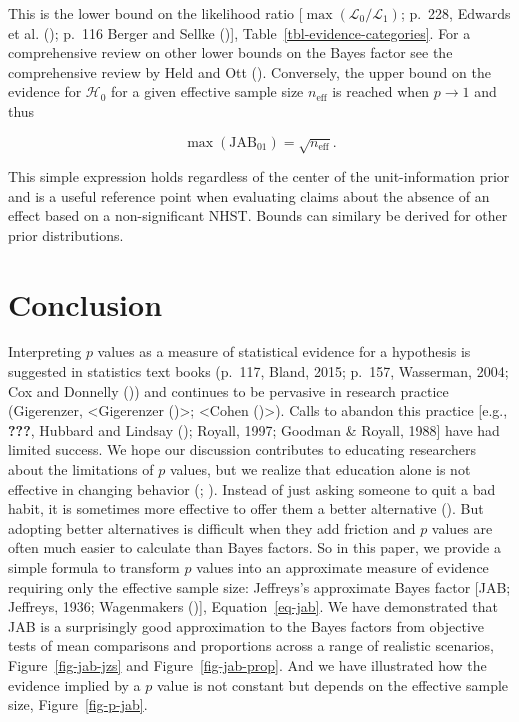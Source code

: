 \documentclass[
  man,
  floatsintext,
  longtable,
  nolmodern,
  notxfonts,
  notimes,
  colorlinks=true,linkcolor=blue,citecolor=blue,urlcolor=blue]{apa7}
\begin{document}
This is the lower bound on the likelihood ratio
{[}\(\max(\mathcal{L}_0 / \mathcal{L}_1)\); p.~228, Edwards et al.
(); p.~116 Berger and Sellke
(){]},
Table~\ref{tbl-evidence-categories}. For a comprehensive review on other
lower bounds on the Bayes factor see the comprehensive review by Held
and Ott (). Conversely, the upper bound on
the evidence for \(\mathcal{H}_0\) for a given effective sample size
\(n_\text{eff}\) is reached when \(p \to 1\) and thus

\[
\max(\text{JAB}_{01}) = \sqrt{n_\text{eff}}.
\]

This simple expression holds regardless of the center of the
unit-information prior and is a useful reference point when evaluating
claims about the absence of an effect based on a non-significant NHST.
Bounds can similary be derived for other prior distributions.

\section{Conclusion}\label{conclusion}

Interpreting \(p\) values as a measure of statistical evidence for a
hypothesis is suggested in statistics text books (p.~117, Bland, 2015;
p.~157, Wasserman, 2004; Cox and Donnelly
()) and continues to be pervasive in
research practice (Gigerenzer, \textless{}Gigerenzer
()\textgreater; \textless{}Cohen
()\textgreater). Calls to abandon this
practice {[}e.g., \textbf{???}, Hubbard and Lindsay
(); Royall, 1997; Goodman \& Royall,
1988{]} have had limited success. We hope our discussion contributes to
educating researchers about the limitations of \(p\) values, but we
realize that education alone is not effective in changing behavior
(;
). Instead of just asking someone to
quit a bad habit, it is sometimes more effective to offer them a better
alternative (). But
adopting better alternatives is difficult when they add friction and
\(p\) values are often much easier to calculate than Bayes factors. So
in this paper, we provide a simple formula to transform \(p\) values
into an approximate measure of evidence requiring only the effective
sample size: Jeffreys's approximate Bayes factor {[}JAB; Jeffreys, 1936;
Wagenmakers (){]},
Equation~\ref{eq-jab}. We have demonstrated that JAB is a surprisingly
good approximation to the Bayes factors from objective tests of mean
comparisons and proportions across a range of realistic scenarios,
Figure~\ref{fig-jab-jzs} and Figure~\ref{fig-jab-prop}. And we have
illustrated how the evidence implied by a \(p\) value is not constant
but depends on the effective sample size, Figure~\ref{fig-p-jab}.
\end{document}
